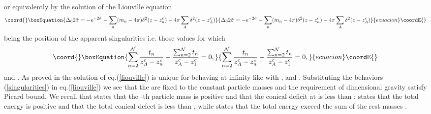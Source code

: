 \documentclass[a4paper,12pt]{article}
\begin{document}
or equivalently by the solution of the Liouville equation
\begin{equation}\coord{}\boxEquation{\label{tildeliouville}
\Delta_0{2\tilde{\sigma}}=-e^{-2\tilde{\sigma}}-\sum_n (m_n-4\pi)
\delta^2(z-z_n^c) -4\pi \sum_A \delta^2(z-z^c_A)
}{\Delta_0{2\tilde{\sigma}}=-e^{-2\tilde{\sigma}}-\sum_n (m_n-4\pi)
\delta^2(z-z_n^c) -4\pi \sum_A \delta^2(z-z^c_A)
}{ecuacion}\coordE{}\end{equation}
being \coordHE{} the position of the apparent singularities i.e. those
values for which
\begin{equation}\coord{}\boxEquation{
\sum_{n=2}^{\cal N}\frac{t_n}{z^c_A-z^c_n}-\frac{\sum_{n=2}^{\cal N}
t_n}{z^c_A-z^c_1}=0, 
}{
\sum_{n=2}^{\cal N}\frac{t_n}{z^c_A-z^c_n}-\frac{\sum_{n=2}^{\cal N}
t_n}{z^c_A-z^c_1}=0, 
}{ecuacion}\coordE{}\end{equation}
and \coordHE{}. As proved in \cite{picard, licht, troyanov} the
solution of eq.(\ref{liouville}) is unique for \coordHE{} behaving
at infinity like \coordHE{} with \coordHE{}, \coordHE{}
and \coordHE{}.  Substituting the behaviors
(\ref{singularities}) in eq.(\ref{liouville}) we see that the \coordHE{}
are fixed to the constant particle masses \coordHE{} and
the requirement of \coordHE{} dimensional gravity \coordHE{}
satisfy Picard  bound. We recall that \coordHE{} states that the
\coordHE{}-th particle mass is positive and that the conical deficit at \coordHE{} is 
less than \myHighlight{$2\pi$}\coordHE{}; \coordHE{} states that the total energy is positive
and that the total conical defect is less than \myHighlight{$2\pi$}\coordHE{}, while
\coordHE{} states that the total energy exceed the sum of the rest
masses \cite{MS,CMS1}. 
\end{document}
